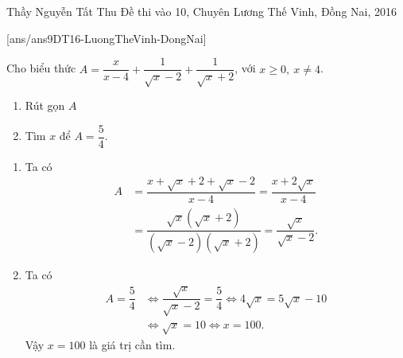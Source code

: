 \begin{name}
{Thầy  Nguyễn Tất Thu}
{Đề thi vào 10, Chuyên Lương Thế Vinh, Đồng Nai, 2016}
\end{name}
\setcounter{ex}{0}
[ans/ans9DT16-LuongTheVinh-DongNai]
\begin{ex}%
    \hfill
    
Cho biểu thức $A=\dfrac{x}{x-4}+\dfrac{1}{\sqrt{x}-2}+\dfrac{1}{\sqrt{x}+2}$, với $x \geq 0,\ x \neq 4$.
\begin{multicols}{2}  
   \begin{enumerate}
   \item Rút gọn $A$
   \item Tìm $x$ để $A=\dfrac{5}{4}$.
   \end{enumerate}
   \end{multicols}
   
\loigiai
    {     
    \begin{enumerate}
    \item Ta có $$\begin{aligned} A&=\dfrac{x+\sqrt{x}+2+\sqrt{x}-2}{x-4}=\dfrac{x+2\sqrt{x}}{x-4}\\ 
     	      &=\dfrac{\sqrt{x}\left( \sqrt{x}+2 \right)}{\left( \sqrt{x}-2 \right)\left( \sqrt{x}+2 \right)}=\dfrac{\sqrt{x}}{\sqrt{x}-2}. \end{aligned}$$ 
\item Ta có $$ \begin{aligned} A=\dfrac{5}{4}& \Leftrightarrow \dfrac{\sqrt{x}}{\sqrt{x}-2}=\dfrac{5}{4}\Leftrightarrow 4\sqrt{x}=5\sqrt{x}-10 \\ & \Leftrightarrow \sqrt{x}=10\Leftrightarrow x=100. \end{aligned}$$ 
Vậy $x=100$ là giá trị cần tìm.
    \end{enumerate}
           }
\end{ex}

